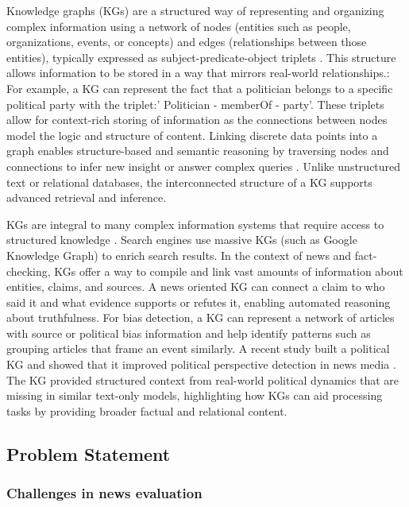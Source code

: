 \documentclass[11pt]{article}
\begin{document}
Knowledge graphs (KGs) are a structured way of representing and organizing complex information using a network of nodes (entities such as people, organizations, events, or concepts) and edges (relationships between those entities), typically expressed as subject-predicate-object triplets \cite{r7}. This structure allows information to be stored in a way that mirrors real-world relationships.: For example, a KG can represent the fact that a politician belongs to a specific political party with the triplet:' Politician - memberOf - party'. These triplets allow for context-rich storing of information as the connections between nodes model the logic and structure of content. Linking discrete data points into a graph enables structure-based and semantic reasoning by traversing nodes and connections to infer new insight or answer complex queries \cite{r8}. Unlike unstructured text or relational databases, the interconnected structure of a KG supports advanced retrieval and inference.

KGs are integral to many complex information systems that require access to structured knowledge \cite{r9}. Search engines use massive KGs (such as Google Knowledge Graph) to enrich search results. In the context of news and fact-checking, KGs offer a way to compile and link vast amounts of information about entities, claims, and sources. A news oriented KG can connect a claim to who said it and what evidence supports or refutes it, enabling automated reasoning about truthfulness\cite{r10}.
For bias detection, a KG can represent a network of articles with source or political bias information and help identify patterns such as grouping articles that frame an event similarly. A recent study built a political KG and showed that it improved political perspective detection in news media \cite{r11}. The KG provided structured context from real-world political dynamics that are missing in similar text-only models, highlighting how KGs can aid processing tasks by providing broader factual and relational content.

 





\subsection{Problem Statement}
\subsubsection{Challenges in news evaluation }
\end{document}
